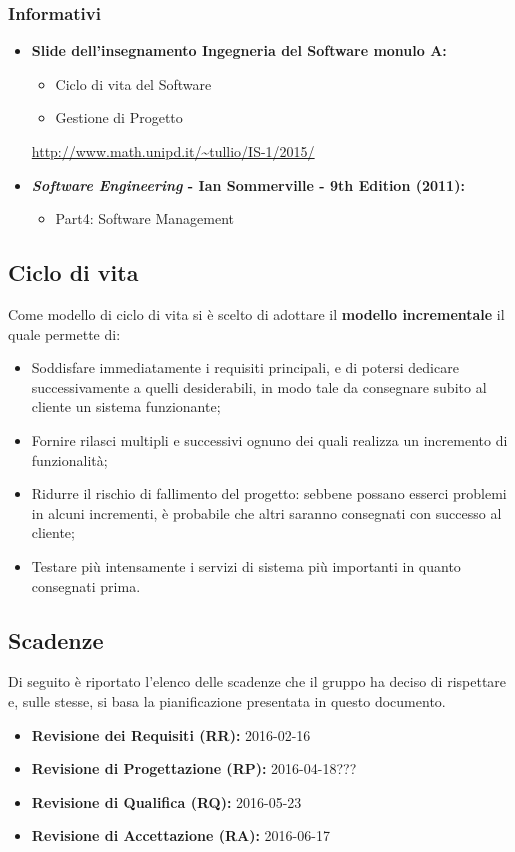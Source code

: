 \subsubsection{Informativi}
\begin{itemize}
\item \textbf{Slide dell'insegnamento Ingegneria del Software monulo A:}
\begin{itemize}
\item Ciclo di vita del Software
\item Gestione di Progetto
\end{itemize}
\url{http://www.math.unipd.it/~tullio/IS-1/2015/}
\item \textbf{\textit{Software Engineering} - Ian Sommerville - 9th Edition (2011):}
\begin{itemize}
\item Part4: Software Management
\end{itemize} 
\end{itemize}

\subsection{Ciclo di vita}
Come modello di ciclo di vita si è scelto di adottare il \textbf{modello incrementale} il quale permette di:
\begin{itemize}
\item Soddisfare immediatamente i requisiti principali, e di potersi dedicare successivamente a quelli desiderabili, in modo tale da consegnare subito al cliente un sistema funzionante;
\item Fornire rilasci multipli e successivi ognuno dei quali realizza un incremento di funzionalità;
\item Ridurre il rischio di fallimento del progetto: sebbene possano esserci problemi in alcuni incrementi, è probabile che altri saranno consegnati con successo al cliente;
\item Testare più intensamente i servizi di sistema più importanti in quanto consegnati prima.
\end{itemize}

\subsection{Scadenze}
Di seguito è riportato l'elenco delle scadenze che il gruppo \GroupName{} ha deciso di rispettare e, sulle stesse, si basa la pianificazione presentata in questo documento.
\begin{itemize}
\item \textbf{Revisione dei Requisiti (RR):} 2016-02-16
\item \textbf{Revisione di Progettazione (RP):} 2016-04-18???
\item \textbf{Revisione di Qualifica (RQ):} 2016-05-23
\item \textbf{Revisione di Accettazione (RA):} 2016-06-17
\end{itemize}

